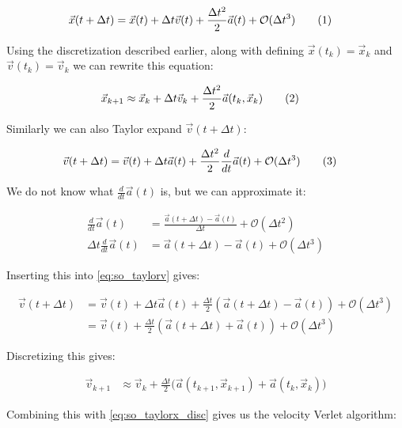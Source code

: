 \documentclass[reprint,english,notitlepage]{revtex4-1}  %
\newcommand\numberthis{\addtocounter{equation}{1}\tag{\theequation}}
\begin{document}
\begin{align*}
\vec{x}(t + \Delta t) &= \vec{x}(t) + \Delta t \vec{v}(t) + \frac{\Delta t^2}{2} \vec{a}(t) + \mathcal{O}(\Delta t^3) \numberthis \label{eq:so_taylorx}
\end{align*}

Using the discretization described earlier, along with defining $\vec{x}(t_k) = \vec{x}_k$ and $\vec{v}(t_k) = \vec{v}_k$ we can rewrite this equation:

\begin{align*}
\vec{x}_{k + 1} &\approx \vec{x}_k + \Delta t \vec{v}_k + \frac{\Delta t^2}{2} \vec{a}(t_k,\vec{x}_k) \numberthis \label{eq:so_taylorx_disc}
\end{align*}

Similarly we can also Taylor expand $\vec{v}(t+\Delta t)$:

\begin{align*}
\vec{v}(t+\Delta t) &= \vec{v}(t) + \Delta t \vec{a}(t) + \frac{\Delta t^2}{2} \frac{d}{dt} \vec{a}(t) + \mathcal{O}(\Delta t^3) \numberthis \label{eq:so_taylorv}
\end{align*}

We do not know what $\frac{d}{dt} \vec{a}(t)$ is, but we can approximate it:

\begin{align*}
\frac{d}{dt}\vec{a}(t) &= \frac{\vec{a}(t+\Delta t) - \vec{a}(t)}{\Delta t} + \mathcal{O}(\Delta t^2) \\
\Delta t \frac{d}{dt} \vec{a}(t) &= \vec{a}(t+ \Delta t ) - \vec{a}(t) + \mathcal{O}(\Delta t^3)
\end{align*}

Inserting this into \eqref{eq:so_taylorv} gives:

\begin{align*}
\vec{v}(t+\Delta t) &= \vec{v}(t) + \Delta t \vec{a}(t) + \frac{\Delta t}{2} (\vec{a}(t+ \Delta t ) - \vec{a}(t)) + \mathcal{O}(\Delta t^3) \\
&= \vec{v}(t) + \frac{\Delta t}{2} (\vec{a}(t+ \Delta t ) + \vec{a}(t)) +  \mathcal{O}(\Delta t^3)
\end{align*}

Discretizing this gives:

\begin{align*}
\vec{v}_{k+1} &\approx \vec{v}_k + \frac{\Delta t}{2} \bigg( \vec{a}(t_{k+1}, \vec{x}_{k+1}) + \vec{a}(t_k, \vec{x}_k) \bigg)
\end{align*}

Combining this with \eqref{eq:so_taylorx_disc} gives us the velocity Verlet algorithm:
\end{document}
